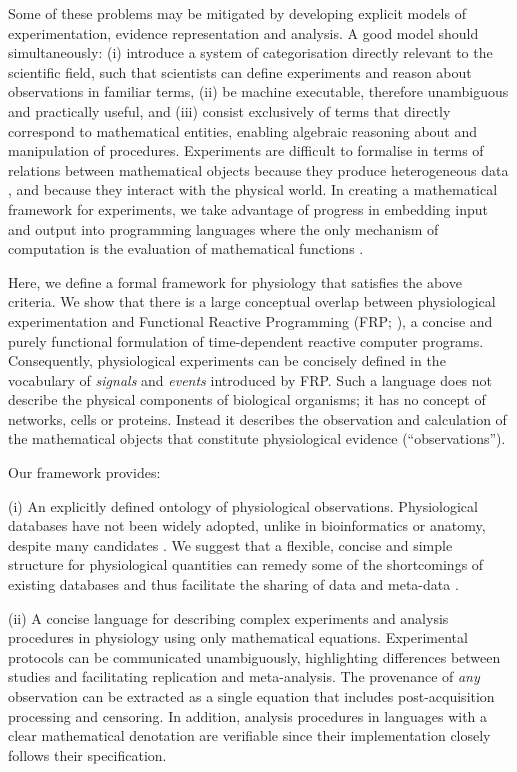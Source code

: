 Some of these problems may be mitigated by developing explicit models
of experimentation, evidence representation and analysis. A good model
should simultaneously: (i) introduce a system of categorisation
directly relevant to the scientific field, such that scientists can
define experiments and reason about observations in familiar terms,
(ii) be machine executable, therefore unambiguous and practically
useful, and (iii) consist exclusively of terms that directly
correspond to mathematical entities, enabling algebraic reasoning
about and manipulation of procedures.  Experiments are difficult to
formalise in terms of relations between mathematical objects because
they produce heterogeneous data \cite{Tukey1962}, and because they
interact with the physical world. In creating a mathematical framework
for experiments, we take advantage of progress in embedding input and
output \cite{PeytonJones2002, Wadler1995} into programming languages
where the only mechanism of computation is the evaluation of
mathematical functions \cite{Church1941}.

Here, we define a formal framework for physiology
that satisfies the above criteria. We show that there
is a large conceptual overlap between physiological experimentation
and Functional Reactive Programming (FRP; \cite{Elliott1997,
  Nilsson2002}), a concise and purely functional formulation of
time-dependent reactive computer programs. Consequently, physiological
experiments can be concisely defined in the vocabulary of
\emph{signals} and \emph{events} introduced by FRP. Such a language
does not describe the physical components of biological organisms; it
has no concept of networks, cells or proteins. Instead it describes
the observation and calculation of the mathematical objects that
constitute physiological evidence (``observations'').

Our framework provides:

(i) An explicitly defined ontology of physiological
observations. Physiological databases have not been widely
adopted\cite{Herz2008, Amari2002}, unlike in bioinformatics or
anatomy, despite many candidates \cite{Jessop2010, Teeters2008,
  Frishkoff2009, Katz2010}.  We suggest that a flexible, concise and
simple structure for physiological quantities can remedy some of the
shortcomings \cite{Gardner2005, Amari2002} of existing databases and
thus facilitate the sharing of data and meta-data \cite{Insel2003}.

(ii) A concise language for describing complex experiments and
analysis procedures in physiology using only mathematical
equations. Experimental protocols can be communicated unambiguously,
highlighting differences between studies and facilitating replication
and meta-analysis. The provenance \cite{Pool2002,MacKenzie-Graham2008,
  VanHorn2009} of \emph{any} observation can be extracted as a single
equation that includes post-acquisition processing and censoring. In
addition, analysis procedures in languages with a clear mathematical
denotation are verifiable since their implementation closely
follows their specification\cite{Bird1996}.

